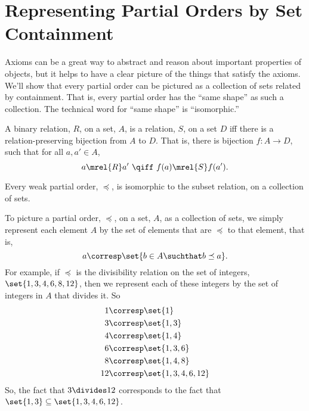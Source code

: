 \begin{problems}
\classproblems
{}

\homeworkproblems
{}

\end{problems}

\section{Representing Partial Orders by Set Containment}

Axioms can be a great way to abstract and reason about important
properties of objects, but it helps to have a clear picture of the things
that satisfy the axioms.  We'll show that every partial order can be
pictured as a collection of sets related by containment.  That is, every
partial order has the ``same shape'' as such a collection.  The technical
word for ``same shape'' is ``isomorphic.''

\begin{definition}\label{relation-isomorphism}
  A binary relation, $R$, on a set, $A$, is
   a relation, $S$, on a set $D$ iff there is a
  relation-preserving bijection from $A$ to $D$.  That is, there is
  bijection $f:A \to D$, such that for all $a,a' \in A$,
  \[
  a \mrel{R} a'\ \qiff\ f(a) \mrel{S} f(a').
  \]
\end{definition}

\begin{theorem}
  Every weak partial order, $\preceq$, is isomorphic to the subset
  relation, on a collection of sets.
\end{theorem}

To picture a partial order, $\preceq$, on a set, $A$, as a collection of
sets, we simply represent each element $A$ by the set of elements
that are $\preceq$ to that element, that is,
\[
a \corresp \set{b \in A \suchthat b \preceq a}.
\]
For example, if $\preceq$ is the divisibility relation on the set of
integers, $\set{1,3,4,6,8,12}$, then we represent each of these integers
by the set of integers in $A$ that divides it.  So
\begin{align*}
1 & \corresp \set{1}\\
3 & \corresp \set{1,3}\\
4 & \corresp \set{1,4}\\
6 & \corresp \set{1,3,6}\\
8 & \corresp \set{1,4,8}\\
12 & \corresp \set{1,3,4,6, 12}
\end{align*}
So, the fact that $3 \divides 12$ corresponds to the fact that $\set{1,3}
\subseteq \set{1,3,4,6, 12}$.

